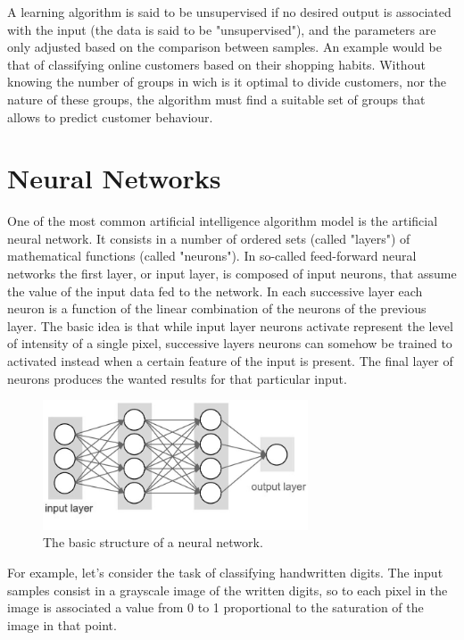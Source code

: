 \documentclass[a4paper]{report}
\begin{document}
A learning algorithm is said to be unsupervised if no desired output is associated with the input (the data is said to be "unsupervised"), and the parameters are only adjusted based on the comparison between samples. An example would be that of classifying online customers based on their shopping habits. Without knowing the number of groups in wich is it optimal to divide customers, nor the nature of these groups, the algorithm must find a suitable set of groups that allows to predict customer behaviour.

\section{Neural Networks}
One of the most common artificial intelligence algorithm model is the artificial neural network. It consists in a number of ordered sets (called "layers") of mathematical functions (called "neurons"). In so-called feed-forward neural networks the first layer, or input layer, is composed of input neurons, that assume the value of the input data fed to the network. In each successive layer each neuron is a function of the linear combination of the neurons of the previous layer. The basic idea is that while input layer neurons activate represent the level of intensity of a single pixel, successive layers neurons can somehow be trained to activated instead when a certain feature of the input is present. The final layer of neurons produces the wanted results for that particular input.
\begin{figure} [H]
\centering
\includegraphics [width=0.7\textwidth] {o/neuralnetwork.png}
\caption{The basic structure of a neural network.}
\end{figure}
For example, let's consider the task of classifying handwritten digits. The input  samples consist in a grayscale image of the written digits, so to each pixel in the image is associated a value from 0 to 1 proportional to the saturation of the image in that point.
\end{document}
